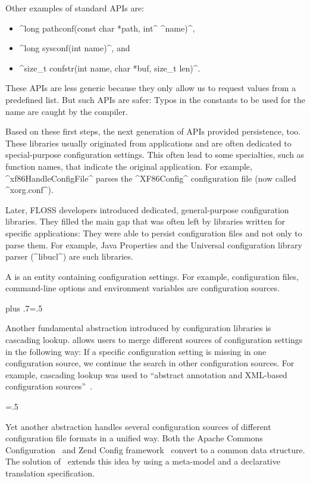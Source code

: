 Other examples of standard APIs are:
\begin{itemize}
\item ^long pathconf(const char *path, int^ ^name)^,
\item ^long sysconf(int name)^, and
\item ^size_t confstr(int name, char *buf, size_t len)^.
\end{itemize}
These APIs are less generic because they only allow us to request values from a predefined list.
But such APIs are safer:
Typos in the constants to be used for the name are caught by the compiler.


Based on these first steps, the next generation of APIs provided persistence, too.
These libraries usually originated from applications and are often dedicated to special-purpose configuration settings.
This often lead to some specialties, such as function names, that indicate the original application.
For example, ^xf86HandleConfigFile^ parses the ^XF86Config^ configuration file (now called ^xorg.conf^).

Later, FLOSS developers introduced dedicated, general-purpose configuration libraries.
They filled the main gap that was often left by libraries written for specific applications:
They were able to persist configuration files and not only to parse them.
For example, Java Properties and the Universal configuration library parser (^libucl^) are such libraries.

A  is an entity containing configuration settings.
For example, configuration files, command-line options and environment variables are configuration sources.%
{\parfillskip=0pt plus .7\textwidth \emergencystretch=.5\textwidth \par}

Another fundamental abstraction introduced by configuration libraries is cascading lookup.
 allows users to merge different sources of configuration settings in the following way:
If a specific configuration setting is missing in one configuration source, we continue the search in other configuration sources.
For example, cascading lookup was used to \enquote{abstract annotation and XML-based configuration sources}~\cite{nosal2012supporting}.%
{\parfillskip=0pt \emergencystretch=.5\textwidth \par}

Yet another abstraction handles several configuration sources of different configuration file formats in a unified way.
Both the Apache Commons Configuration~\cite{online2016apache} and Zend Config framework~\cite{online2016zend} convert to a common data structure.
The solution of~\citet{poruban2011common,nosal2012supporting} extends this idea by using a meta-model and a declarative translation specification.

